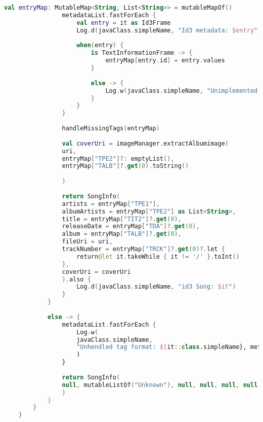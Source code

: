 \begin{lstlisting}[caption=Metoda \texttt{buildSongInfo()}, label={lst:Tag-buildsonginfo}, language=kotlin]
				val entryMap: MutableMap<String, List<String>> = mutableMapOf()
				metadataList.fastForEach {
					val entry = it as Id3Frame
					Log.d(javaClass.simpleName, "Id3 metadata: $entry")
					
					when(entry) {
						is TextInformationFrame -> {
							entryMap[entry.id] = entry.values
						}
						
						else -> {
							Log.w(javaClass.simpleName, "Unimplemented id3 frame: $entry")
						}
					}
				}
				
				handleMissingTags(entryMap)
				
				val coverUri = imageManager.extractAlbumimage(
				uri,
				entryMap["TPE2"]?: emptyList(),
				entryMap["TALB"]?.get(0).toString()
				
				)
				
				return SongInfo(
				artists = entryMap["TPE1"],
				albumArtists = entryMap["TPE2"] as List<String>,
				title = entryMap["TIT2"]?.get(0),
				releaseDate = entryMap["TDA"]?.get(0),
				album = entryMap["TALB"]?.get(0),
				fileUri = uri,
				trackNumber = entryMap["TRCK"]?.get(0)?.let {
					return@let it.takeWhile { it != '/' }.toInt()
				},
				coverUri = coverUri
				).also {
					Log.d(javaClass.simpleName, "id3 Song: $it")
				}
			}
			
			else -> {
				metadataList.fastForEach {
					Log.w(
					javaClass.simpleName,
					"Unhendled tag format: ${it::class.simpleName}, metadata: $it"
					)
				}
				
				return SongInfo(
				null, mutableListOf("Unknown"), null, null, null, null, null, null
				)
			}
		}
	}
\end{lstlisting}

